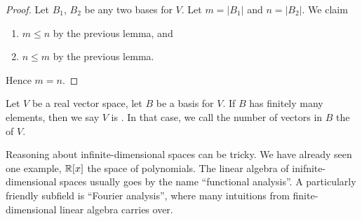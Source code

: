 \begin{proof}
Let $B_{1}$, $B_{2}$ be any two bases for $V$. Let $m=|B_{1}|$ and $n=|B_{2}|$.
We claim
\begin{enumerate}
\item $m\leq n$ by the previous lemma, and
\item $n\leq m$ by the previous lemma.
\end{enumerate}
Hence $m=n$.
\end{proof}

\begin{definition}
Let $V$ be a real vector space, let $B$ be a basis for $V$. If $B$ has
finitely many elements, then we say $V$ is
. In that case, we call the number of vectors
in $B$ the  of $V$.
\end{definition}

\begin{remark}
Reasoning about infinite-dimensional spaces can be tricky. We have
already seen one example, $\mathbb{R}[x]$ the space of polynomials. The linear
algebra of inifnite-dimensional spaces usually goes by the name
``functional analysis''. A particularly friendly subfield is ``Fourier
analysis'', where many intuitions from finite-dimensional linear algebra
carries over.
\end{remark}